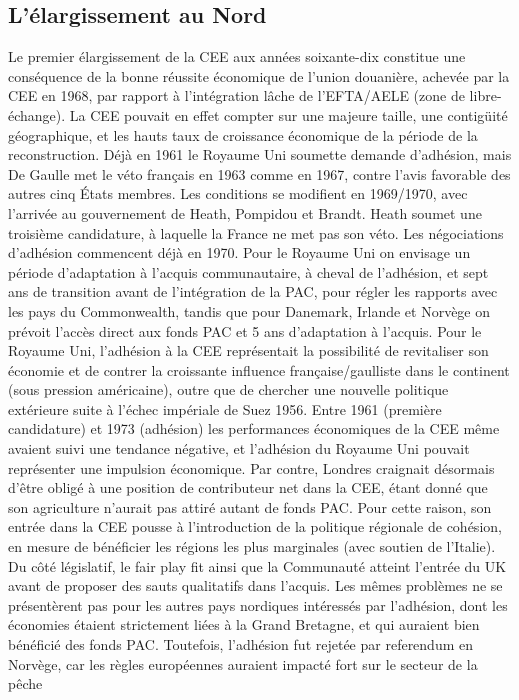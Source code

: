 \documentclass{report}%
\begin{document}
\subsection{L'élargissement au Nord}
Le premier élargissement de la CEE aux années soixante-dix constitue une conséquence de la bonne réussite économique de l’union douanière, achevée par la CEE en 1968, par rapport à l’intégration lâche de l’EFTA/AELE (zone de libre-échange). La CEE pouvait en effet compter sur une majeure taille, une contigüité géographique, et les hauts taux de croissance économique de la période de la reconstruction. Déjà en 1961 le Royaume Uni soumette demande d’adhésion, mais De Gaulle met le véto français en 1963 comme en 1967, contre l’avis favorable des autres cinq États membres.
Les conditions se modifient en 1969/1970, avec l’arrivée au gouvernement de Heath, Pompidou et Brandt. Heath soumet une troisième candidature, à laquelle la France ne met pas son véto. Les négociations d’adhésion commencent déjà en 1970. Pour le Royaume Uni on envisage un période d'adaptation à l’acquis communautaire, à cheval de l’adhésion, et sept ans de transition avant de l’intégration de la PAC, pour régler les rapports avec les pays du Commonwealth, tandis que pour Danemark, Irlande et Norvège on prévoit l’accès direct aux fonds PAC et 5 ans d’adaptation à l’acquis. Pour le Royaume Uni, l’adhésion à la CEE représentait la possibilité de revitaliser son économie et de contrer la croissante influence française/gaulliste dans le continent (sous pression américaine), outre que de chercher une nouvelle politique extérieure suite à l’échec impériale de Suez 1956.
Entre 1961 (première candidature) et 1973 (adhésion) les performances économiques de la CEE même avaient suivi une tendance négative, et l’adhésion du Royaume Uni pouvait représenter une impulsion économique. Par contre, Londres craignait désormais d’être obligé à une position de contributeur net dans la CEE, étant donné que son agriculture n’aurait pas attiré autant de fonds PAC. Pour cette raison, son entrée dans la CEE pousse à l’introduction de la politique régionale de cohésion, en mesure de bénéficier les régions les plus marginales (avec soutien de l’Italie). Du côté législatif, le fair play fit ainsi que la Communauté atteint l’entrée du UK avant de proposer des sauts qualitatifs dans l’acquis. Les mêmes problèmes ne se présentèrent pas pour les autres pays nordiques intéressés par l’adhésion, dont les économies étaient strictement liées à la Grand Bretagne, et qui auraient bien bénéficié des fonds PAC. Toutefois, l’adhésion fut rejetée par referendum en Norvège, car les règles européennes auraient impacté fort sur le secteur de la pêche
\end{document}
